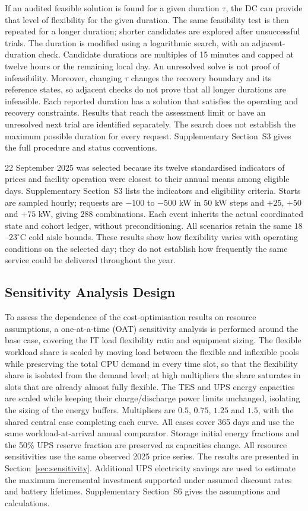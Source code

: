 \documentclass[lettersize,journal]{IEEEtran}
\begin{document}
If an audited feasible solution is found for a given duration $\tau$, the DC can provide that level of flexibility for the given duration. The same feasibility test is then repeated for a longer duration; shorter candidates are explored after unsuccessful trials. The duration is modified using a logarithmic search, with an adjacent-duration check. Candidate durations are multiples of 15 minutes and capped at twelve hours or the remaining local day. An unresolved solve is not proof of infeasibility. Moreover, changing $\tau$ changes the recovery boundary and its reference states, so adjacent checks do not prove that all longer durations are infeasible. Each reported duration has a solution that satisfies the operating and recovery constraints. Results that reach the assessment limit or have an unresolved next trial are identified separately. The search does not establish the maximum possible duration for every request. Supplementary Section~S3 gives the full procedure and status conventions.

22 September 2025 was selected because its twelve standardised indicators of prices and facility operation were closest to their annual means among eligible days. Supplementary Section~S3 lists the indicators and eligibility criteria. Starts are sampled hourly; requests are $-100$ to $-500$ kW in 50 kW steps and $+25$, $+50$ and $+75$ kW, giving 288 combinations. Each event inherits the actual coordinated state and cohort ledger, without preconditioning. All scenarios retain the same $18$--$23^\circ$C cold aisle bounds. These results show how flexibility varies with operating conditions on the selected day; they do not establish how frequently the same service could be delivered throughout the year.

\subsection{Sensitivity Analysis Design}\label{sec:sensitivity-design}
To assess the dependence of the cost-optimisation results on resource assumptions, a one-at-a-time (OAT) sensitivity analysis is performed around the base case, covering the IT load flexibility ratio and equipment sizing. The flexible workload share is scaled by moving load between the flexible and inflexible pools while preserving the total CPU demand in every time slot, so that the flexibility share is isolated from the demand level; at high multipliers the share saturates in slots that are already almost fully flexible. The TES and UPS energy capacities are scaled while keeping their charge/discharge power limits unchanged, isolating the sizing of the energy buffers. Multipliers are $0.5$, $0.75$, $1.25$ and $1.5$, with the shared central case completing each curve. All cases cover 365 days and use the same workload-at-arrival annual comparator. Storage initial energy fractions and the 50\% UPS reserve fraction are preserved as capacities change. All resource sensitivities use the same observed 2025 price series. The results are presented in Section~\ref{sec:sensitivity}. Additional UPS electricity savings are used to estimate the maximum incremental investment supported under assumed discount rates and battery lifetimes. Supplementary Section~S6 gives the assumptions and calculations.
\end{document}
